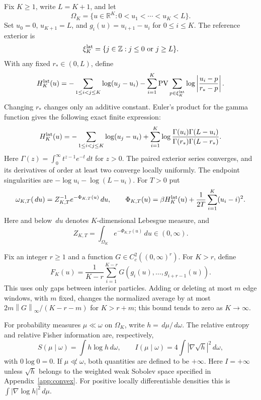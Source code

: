 \documentclass[11pt,reqno]{amsart}
\numberwithin{equation}{section}
\theoremstyle{definition}
\theoremstyle{remark}
\newcommand{\R}{\mathbb R}
\newcommand{\Z}{\mathbb Z}
\newcommand{\1}{\mathbf 1}
\newcommand{\PV}{\operatorname{PV}}
\newcommand{\dd}{\,d}
\newcommand{\norm}[1]{\left\lVert #1\right\rVert}
\newcommand{\abs}[1]{\left\lvert #1\right\rvert}
\begin{document}
Fix $K\ge1$, write $L=K+1$, and let
\[
\Omega_K=\{u\in\R^K:0<u_1<\cdots<u_K<L\}.
\]
Set $u_0=0$, $u_{K+1}=L$, and $g_i(u)=u_{i+1}-u_i$ for
$0\le i\le K$. The reference exterior is
\[
\xi_K^{\rm lat}=\{j\in\Z:j\le0\text{ or }j\ge L\}.
\]
With any fixed $r_*\in(0,L)$, define
\begin{equation}\label{eq:lattice-energy}
H_K^{\rm lat}(u)=
-\sum_{1\le i<j\le K}\log(u_j-u_i)
-\sum_{i=1}^K\PV\sum_{p\in\xi_K^{\rm lat}}
       \log\abs{\frac{u_i-p}{r_*-p}}.
\end{equation}
Changing $r_*$ changes only an additive constant. Euler's product for
the gamma function gives the following exact finite expression:
\begin{equation}\label{eq:lattice-gamma-energy}
H_K^{\rm lat}(u)=
-\sum_{1\le i<j\le K}\log(u_j-u_i)
+\sum_{i=1}^K\log
 \frac{\Gamma(u_i)\Gamma(L-u_i)}{\Gamma(r_*)\Gamma(L-r_*)}.
\end{equation}
Here $\Gamma(z)=\int_0^\infty t^{z-1}e^{-t}\dd t$ for $z>0$.
The paired exterior series converges, and its derivatives of order at
least two converge locally uniformly. The endpoint singularities are
$-\log u_i-\log(L-u_i)$.
For $T>0$ put
\begin{equation}\label{eq:reference}
\omega_{K,T}(\dd u)=Z_{K,T}^{-1}e^{-\Phi_{K,T}(u)}\dd u,\qquad
\Phi_{K,T}(u)=\beta H_K^{\rm lat}(u)
                  +\frac1{2T}\sum_{i=1}^K(u_i-i)^2.
\end{equation}
Here and below $\dd u$ denotes $K$-dimensional Lebesgue measure, and
\begin{equation}\label{eq:reference-normalizer}
Z_{K,T}=\int_{\Omega_K}e^{-\Phi_{K,T}(u)}\dd u\in(0,\infty).
\end{equation}

Fix an integer $r\ge1$ and a function $G\in C_c^2((0,\infty)^r)$.
For $K>r$, define
\begin{equation}\label{eq:gap-observable}
F_K(u)=\frac1{K-r}
\sum_{i=1}^{K-r}G(g_i(u),\ldots,g_{i+r-1}(u)).
\end{equation}
This uses only gaps between interior particles. Adding or deleting at
most $m$ edge windows, with $m$ fixed, changes the normalized average
by at most $2m\norm G_\infty/(K-r-m)$ for $K>r+m$; this bound tends
to zero as $K\to\infty$.

For probability measures $\mu\ll\omega$ on $\Omega_K$, write
$h=\dd\mu/\dd\omega$. The relative entropy and relative Fisher
information are, respectively,
\begin{equation}\label{eq:entropy-fisher-definitions}
S(\mu\mid\omega)=\int h\log h\dd\omega,\qquad
I(\mu\mid\omega)=4\int\abs{\nabla\sqrt h}^2\dd\omega,
\end{equation}
with $0\log0=0$. If $\mu\not\ll\omega$, both quantities are defined
to be $+\infty$.
Here $I=+\infty$ unless $\sqrt h$ belongs to the weighted weak
Sobolev space specified in Appendix~\ref{app:convex}. For positive
locally differentiable densities this is
$\int|\nabla\log h|^2\dd\mu$.
\end{document}

